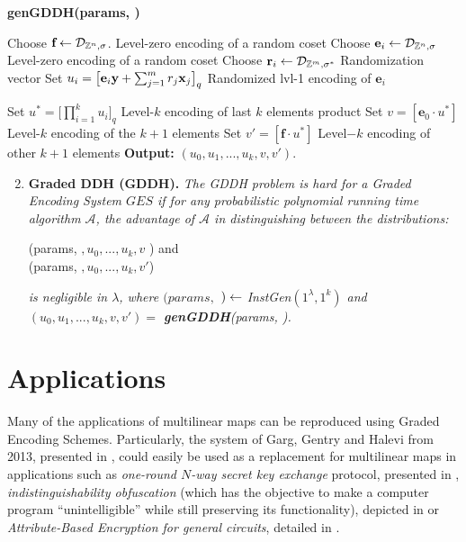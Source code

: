 \begin{tcolorbox}[colframe=black,colback=white,arc=0pt,outer arc=0pt]
	\begin{center}
		\textbf{genGDDH(params, \pzt)}
	\end{center}
	\begin{algorithmic}[1]
		\State Choose $\textbf{f} \leftarrow \mathcal{D}_{{\mathbb Z}^n, \sigma}$. \Comment Level-zero encoding of a random coset
		\State Choose $\textbf{e}_i \leftarrow \mathcal{D}_{{\mathbb Z}^n, \sigma}$ \Comment Level-zero encoding of a random coset
		\State Choose $\textbf{r}_i \leftarrow \mathcal{D}_{{\mathbb Z}^m, \sigma^*}$ \Comment Randomization vector
		\State Set $u_i = \big[\textbf{e}_i\textbf{y} + \sum_{j=1}^{m} r_j \textbf{x}_j \big]_q$ \Comment Randomized lvl-1 encoding of $\textbf{e}_i$
		\EndFor
		
		\State Set $u^* = \big[ \prod_{i = 1}^{k} u_ i\big] _q$  \Comment Level-$k$ encoding of last $k$ elements product
		\State Set $v = [\textbf{e}_0 \cdot u^*]$ \Comment Level-$k$ encoding of the $k+1$ elements
		\State Set $v' = [\textbf{f} \cdot u^*]$ \Comment Level$-k$ encoding of other $k+1$ elements
		\State \textbf{Output:} $(u_0, u_1, ..., u_k, v, v')$.
	\end{algorithmic}
\end{tcolorbox}

	
	\begin{enumerate}
	 \setcounter{enumi}{1}

	\item \textbf{Graded DDH (GDDH). } \textit{The GDDH problem is hard for a Graded Encoding System $GES$ if for any probabilistic polynomial running time algorithm $\mathcal{A}$, the advantage of $\mathcal{A}$ in distinguishing between the distributions:}
	
	\begin{center}
		(params, {\pzt}$, u_0, ... ,u_k, v$ ) and \\
		(params, {\pzt}$, u_0, ... ,u_k, v'$)
	\end{center}
	\textit{is negligible in $\lambda$, where $(params, $ {\pzt} $)\leftarrow$ InstGen$(1^\lambda, 1^k)$ and $(u_0, u_1, ..., u_k, v, v') =$ \textbf{genGDDH}(params, \pzt).}
\end{enumerate} 

\section{Applications}

Many of the applications of multilinear maps can be reproduced using Graded Encoding Schemes. Particularly, the system of Garg, Gentry and Halevi from 2013, presented in \cite{GGH13}, could easily be used as a replacement for multilinear maps in applications such as \textit{one-round $N$-way secret key exchange} protocol, presented in \cite{GGH13}, \textit{indistinguishability obfuscation} (which has the objective to make a computer program “unintelligible” while still preserving its functionality), depicted in \cite{GGH+13b} or \textit{Attribute-Based Encryption for general circuits}, detailed in \cite{GGH+13a}.\\

